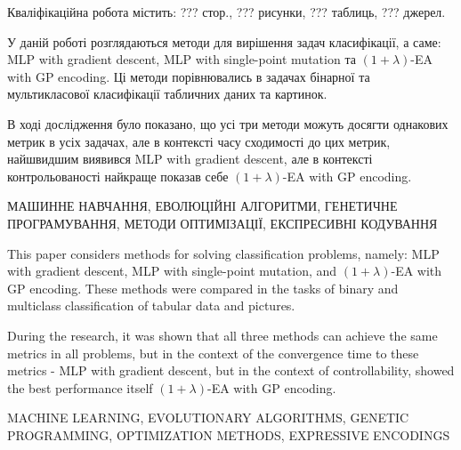 
\abstractUkr

Кваліфікаційна робота містить: ??? стор., ??? рисунки, ??? таблиць, ??? джерел.

У даній роботі розглядаються методи для вирішення задач класифікації, а саме: MLP with gradient descent, MLP with single-point mutation та $(1+\lambda)$-EA with GP encoding. Ці методи порівнювались в задачах бінарної та мультикласової класифікації табличних даних та картинок.

В ході дослідження було показано, що усі три методи можуть досягти однакових метрик в усіх задачах, але в контексті часу сходимості до цих метрик, найшвидшим виявився MLP with gradient descent, але в контексті контрольованості найкраще показав себе $(1+\lambda)$-EA with GP encoding.

\MakeUppercase{МАШИННЕ НАВЧАННЯ, ЕВОЛЮЦІЙНІ АЛГОРИТМИ, ГЕНЕТИЧНЕ ПРОГРАМУВАННЯ, МЕТОДИ ОПТИМІЗАЦІЇ, ЕКСПРЕСИВНІ КОДУВАННЯ}


%

\abstractEng

This paper considers methods for solving classification problems, namely: MLP with gradient descent, MLP with single-point mutation, and $(1+\lambda)$-EA with GP encoding. These methods were compared in the tasks of binary and multiclass classification of tabular data and pictures.

During the research, it was shown that all three methods can achieve the same metrics in all problems, but in the context of the convergence time to these metrics - MLP with gradient descent, but in the context of controllability, showed the best performance itself $(1+\lambda)$-EA with GP encoding.

\MakeUppercase{MACHINE LEARNING, EVOLUTIONARY ALGORITHMS, GENETIC PROGRAMMING, OPTIMIZATION METHODS, EXPRESSIVE ENCODINGS}

\clearpage